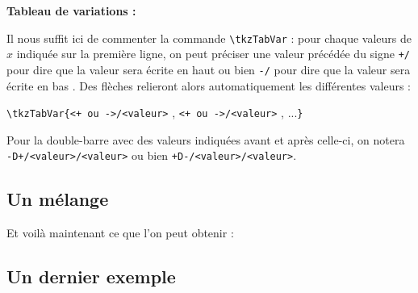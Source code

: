 \begin{CenterExample}
    \textbf{Tableau de variations :}\par
\end{CenterExample}
\bigskip

Il nous suffit ici de commenter la commande \texttt{\textbackslash tkzTabVar} : pour chaque valeurs de $x$ indiquée sur la première ligne, on peut préciser une valeur précédée du signe \verb!+/! pour dire que la valeur sera écrite \og en haut\fg{} ou bien \verb!-/! pour dire que la valeur sera écrite \og en bas \fg{}. Des flèches relieront alors automatiquement les différentes valeurs :
\begin{center}
    \texttt{\textbackslash tkzTabVar}{\tt\{}\texttt{<+ ou ->}{\tt/}\texttt{<valeur>} , \texttt{<+ ou ->}{\tt/}\texttt{<valeur>} , ...{\tt\}}
\end{center}

\begin{info}
    Pour la double-barre avec des valeurs indiquées avant et après celle-ci, on notera {\tt -D+/\texttt{<valeur>}/\texttt{<valeur>}} ou bien {\tt +D-/\texttt{<valeur>}/\texttt{<valeur>}}.
\end{info}

\subsection{Un mélange}
Et voilà maintenant ce que l'on peut obtenir :

\vspace*{-12pt}
\begin{CenterExample}
\end{CenterExample}

\subsection{Un dernier exemple}

